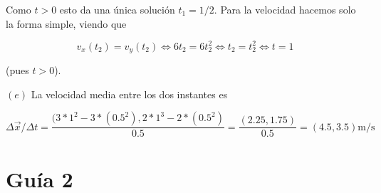 \documentclass[12pt]{article}
\theoremstyle{definition}
\begin{document}
Como $t > 0$ esto da una única solución $t_1 = 1 / 2$. Para la velocidad hacemos
solo la forma simple, viendo que 

\begin{equation*}
    v_x(t_2) = v_y(t_2) \iff 6t_2 = 6t_2^2 \iff t_2 = t_2^2 \iff t = 1
\end{equation*}

(pues $t > 0$).  

$(e)$ La velocidad media entre los dos instantes es 


\begin{equation*}
    \Delta \vec{x} / \Delta t = \frac{(3 * 1^2 - 3*( 0.5^2 ), 2*1^3 -
    2*(0.5^2)}{0.5} = \frac{(2.25, 1.75)}{0.5} = (4.5, 3.5)\text{m/s}
\end{equation*}

\pagebreak 

\section{Guía 2}
\end{document}
